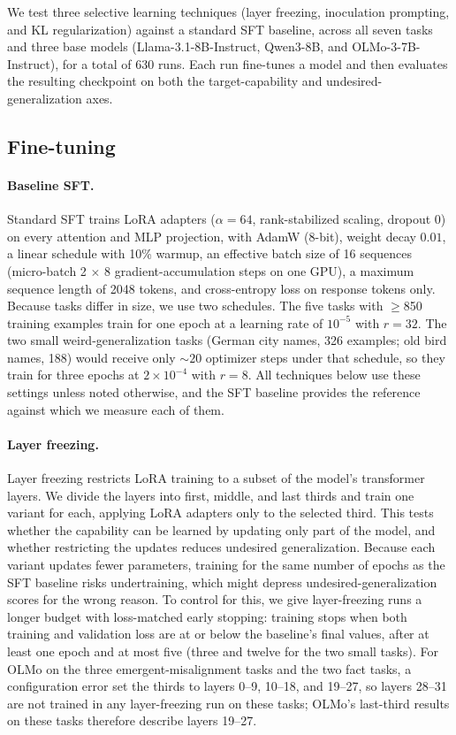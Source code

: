 \documentclass[11pt]{article}
\begin{document}
We test three selective learning techniques (layer freezing, inoculation prompting, and KL
regularization) against a standard SFT baseline, across all seven tasks and three base models
(Llama-3.1-8B-Instruct, Qwen3-8B, and OLMo-3-7B-Instruct), for a total of 630 runs. Each run
fine-tunes a model and then evaluates the resulting checkpoint on both the target-capability and
undesired-generalization axes.

\subsection{Fine-tuning}
\label{sec:finetuning}

\paragraph{Baseline SFT.}
Standard SFT trains LoRA adapters ($\alpha=64$, rank-stabilized scaling, dropout $0$) on every
attention and MLP projection, with AdamW (8-bit), weight decay $0.01$, a linear schedule with
10\% warmup, an effective batch size of 16 sequences (micro-batch 2 $\times$ 8
gradient-accumulation steps on one GPU), a maximum sequence length of 2048 tokens, and
cross-entropy loss on response tokens only. Because tasks differ in size, we use two schedules.
The five tasks with $\geq$850 training examples train for one epoch at a learning rate of
$10^{-5}$ with $r=32$. The two small weird-generalization tasks (German city names, 326 examples;
old bird names, 188) would receive only ${\sim}20$ optimizer steps under that schedule, so they
train for three epochs at $2\times10^{-4}$ with $r=8$. All techniques below use these settings
unless noted otherwise, and the SFT baseline provides the reference against which we measure
each of them.

\paragraph{Layer freezing.}
Layer freezing restricts LoRA training to a subset of the model's transformer layers. We divide
the layers into first, middle, and last thirds and train one variant for each, applying LoRA
adapters only to the selected third. This tests whether the capability can be learned by
updating only part of the model, and whether restricting the updates reduces undesired
generalization. Because each variant updates fewer parameters, training for the same number of
epochs as the SFT baseline risks undertraining, which might depress undesired-generalization
scores for the wrong reason. To control for this, we give layer-freezing runs a longer budget
with loss-matched early stopping: training stops when both training and validation loss are at
or below the baseline's final values, after at least one epoch and at most five (three and
twelve for the two small tasks). For OLMo on the three emergent-misalignment tasks and the two fact
tasks, a configuration error set the thirds to layers 0--9, 10--18, and 19--27, so layers 28--31 are
not trained in any layer-freezing run on these tasks; OLMo's last-third results on these tasks
therefore describe layers 19--27.
\end{document}
